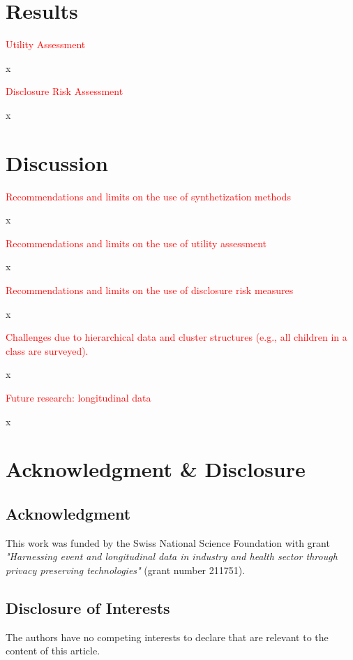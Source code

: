 \documentclass{article}
\begin{document}
\section{Results}

\textcolor{red}{Utility Assessment}

x

\textcolor{red}{Disclosure Risk Assessment}

x

\section{Discussion}

\textcolor{red}{Recommendations and limits on the use of synthetization methods}

x

\textcolor{red}{Recommendations and limits on the use of utility assessment}

x

\textcolor{red}{Recommendations and limits on the use of disclosure risk measures}

x

\textcolor{red}{Challenges due to hierarchical data and cluster structures (e.g., all children in a class are surveyed).}

x

\textcolor{red}{Future research: longitudinal data}

x

\section*{Acknowledgment \& Disclosure} 
\subsection*{Acknowledgment} 
This work was funded by the Swiss National Science Foundation with grant \textit{"Harnessing event and longitudinal data in industry and health sector through privacy preserving technologies"} (grant number 211751).

\subsection*{Disclosure of Interests} 
The authors have no competing interests to declare that are relevant to the content of this article. 




\end{document}
